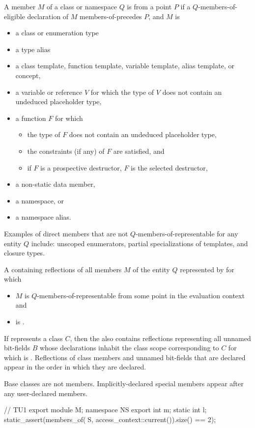 \begin{itemdescr}
\pnum
A member $M$ of a class or namespace $Q$ is
 from a point $P$
if a $Q$-members-of-eligible declaration of $M$ members-of-precedes $P$,
and $M$ is
\begin{itemize}
\item
  a class or enumeration type
\item
  a type alias
\item
  a class template, function template,
  variable template, alias template, or concept,
\item
  a variable or reference $V$
  for which the type of $V$ does not contain an undeduced placeholder type,
\item
  a function $F$ for which
  \begin{itemize}
  \item
    the type of $F$  does not contain an undeduced placeholder type,
  \item
    the constraints (if any) of $F$ are satisfied, and
  \item
    if $F$ is a prospective destructor,
    $F$ is the selected destructor,
  \end{itemize}
\item
  a non-static data member,
\item
  a namespace, or
\item
  a namespace alias.
\end{itemize}
\begin{note}
Examples of direct members that are not $Q$-members-of-representable
for any entity $Q$ include:
unscoped enumerators,
partial specializations of templates, and
closure types.
\end{note}

\pnum
\returns
A  containing reflections of all members $M$
of the entity $Q$ represented by  for which
\begin{itemize}
\item
  $M$ is $Q$-members-of-representable
  from some point in the evaluation context and
\item
   is .
\end{itemize}
If  represents a class $C$,
then the  also contains reflections
representing all unnamed bit-fields $B$
whose declarations inhabit the class scope corresponding to $C$
for which  is .
Reflections of class members and unnamed bit-fields that are declared
appear in the order in which they are declared.
\begin{note}
Base classes are not members.
Implicitly-declared special members
appear after any user-declared members.
\end{note}
\begin{example}
\begin{codeblock}
// TU1
export module M;
namespace NS {
  export int m;
  static int l;
}
static_assert(members_of(^^NS, access_context::current()).size() == 2);


\end{codeblock}
\end{example}
\end{itemdescr}
